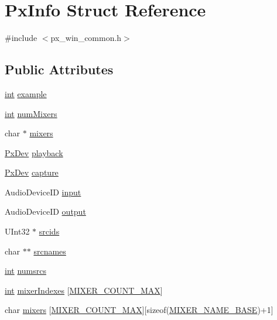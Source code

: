 \hypertarget{struct_px_info}{}\section{Px\+Info Struct Reference}
\label{struct_px_info}


{\ttfamily \#include $<$px\+\_\+win\+\_\+common.\+h$>$}

\subsection*{Public Attributes}
\begin{DoxyCompactItemize}
\item 
\hyperlink{xmltok_8h_a5a0d4a5641ce434f1d23533f2b2e6653}{int} \hyperlink{struct_px_info_a9afce6fca9e51e573ca82289554fa29d}{example}
\item 
\hyperlink{xmltok_8h_a5a0d4a5641ce434f1d23533f2b2e6653}{int} \hyperlink{struct_px_info_a557a6daaf51ce5c34a4af36d4c67eeba}{num\+Mixers}
\item 
char $\ast$ \hyperlink{struct_px_info_a99ac87bf9f934ade5ee528c70109cdaa}{mixers}
\item 
\hyperlink{struct_px_dev}{Px\+Dev} \hyperlink{struct_px_info_a7a848184df827bee1730b9538a496d96}{playback}
\item 
\hyperlink{struct_px_dev}{Px\+Dev} \hyperlink{struct_px_info_aec3013aa49d245fed08dc870cdcdb186}{capture}
\item 
Audio\+Device\+ID \hyperlink{struct_px_info_a8285612dd16519bfe8bac5b81f02a7e1}{input}
\item 
Audio\+Device\+ID \hyperlink{struct_px_info_a7c76d827b0584d2705762fd816165248}{output}
\item 
U\+Int32 $\ast$ \hyperlink{struct_px_info_a57da3d98a893d2211268b3e75f7289c3}{srcids}
\item 
char $\ast$$\ast$ \hyperlink{struct_px_info_a785fd286c6d4798194d4dcb75ab16d9f}{srcnames}
\item 
\hyperlink{xmltok_8h_a5a0d4a5641ce434f1d23533f2b2e6653}{int} \hyperlink{struct_px_info_aea47361fc147f8115340e195e312acaa}{numsrcs}
\item 
\hyperlink{xmltok_8h_a5a0d4a5641ce434f1d23533f2b2e6653}{int} \hyperlink{struct_px_info_a5a077bf933573ec7022f220d92a9ad13}{mixer\+Indexes} \mbox{[}\hyperlink{px__unix__oss_8c_a46a0f5e5fcbea8d20af2c4d1d8f402d7}{M\+I\+X\+E\+R\+\_\+\+C\+O\+U\+N\+T\+\_\+\+M\+AX}\mbox{]}
\item 
char \hyperlink{struct_px_info_ae41c32a96f28eb8043d869a52870d939}{mixers} \mbox{[}\hyperlink{px__unix__oss_8c_a46a0f5e5fcbea8d20af2c4d1d8f402d7}{M\+I\+X\+E\+R\+\_\+\+C\+O\+U\+N\+T\+\_\+\+M\+AX}\mbox{]}\mbox{[}sizeof(\hyperlink{px__unix__oss_8c_a8495de1259921807d47a4b2936e557c1}{M\+I\+X\+E\+R\+\_\+\+N\+A\+M\+E\+\_\+\+B\+A\+SE})+1\mbox{]}
$$
\end{DoxyCompactItemize}
